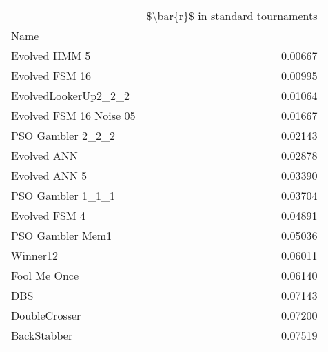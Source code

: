 \begin{tabular}{lr}
\toprule
{} &  \$\textbackslash bar\{r\}\$ in standard tournaments \\
Name                    &                                    \\
\midrule
Evolved HMM 5           &                            0.00667 \\
Evolved FSM 16          &                            0.00995 \\
EvolvedLookerUp2\_2\_2    &                            0.01064 \\
Evolved FSM 16 Noise 05 &                            0.01667 \\
PSO Gambler 2\_2\_2       &                            0.02143 \\
Evolved ANN             &                            0.02878 \\
Evolved ANN 5           &                            0.03390 \\
PSO Gambler 1\_1\_1       &                            0.03704 \\
Evolved FSM 4           &                            0.04891 \\
PSO Gambler Mem1        &                            0.05036 \\
Winner12                &                            0.06011 \\
Fool Me Once            &                            0.06140 \\
DBS                     &                            0.07143 \\
DoubleCrosser           &                            0.07200 \\
BackStabber             &                            0.07519 \\
\bottomrule
\end{tabular}
